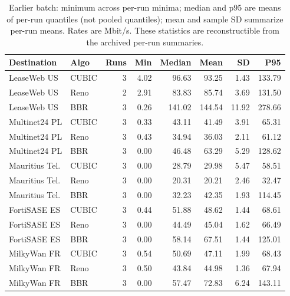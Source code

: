 \begin{table}[!htbp]
\centering
\footnotesize
\setlength{\tabcolsep}{3pt}
\caption{Earlier batch: minimum across per-run minima; median and p95 are means of per-run quantiles (not pooled quantiles); mean and sample SD summarize per-run means. Rates are Mbit/s. These statistics are reconstructible from the archived per-run summaries.}
\begin{tabular}{@{}llrrrrrr@{}}
\toprule
Destination & Algo & Runs & Min & Median & Mean & SD & P95 \\
\midrule
LeaseWeb US & CUBIC & 3 & 4.02 & 96.63 & 93.25 & 1.43 & 133.79 \\
LeaseWeb US & Reno & 2 & 2.91 & 83.83 & 85.74 & 3.69 & 131.50 \\
LeaseWeb US & BBR & 3 & 0.26 & 141.02 & 144.54 & 11.92 & 278.66 \\
Multinet24 PL & CUBIC & 3 & 0.33 & 43.11 & 41.49 & 3.91 & 65.31 \\
Multinet24 PL & Reno & 3 & 0.43 & 34.94 & 36.03 & 2.11 & 61.12 \\
Multinet24 PL & BBR & 3 & 0.00 & 46.48 & 63.29 & 5.29 & 128.62 \\
Mauritius Tel. & CUBIC & 3 & 0.00 & 28.79 & 29.98 & 5.47 & 58.51 \\
Mauritius Tel. & Reno & 3 & 0.00 & 20.31 & 20.21 & 2.46 & 32.47 \\
Mauritius Tel. & BBR & 3 & 0.00 & 32.23 & 42.35 & 1.93 & 114.45 \\
FortiSASE ES & CUBIC & 3 & 0.44 & 51.88 & 48.62 & 1.44 & 68.61 \\
FortiSASE ES & Reno & 3 & 0.00 & 44.49 & 45.04 & 1.62 & 66.49 \\
FortiSASE ES & BBR & 3 & 0.00 & 58.14 & 67.51 & 1.44 & 125.01 \\
MilkyWan FR & CUBIC & 3 & 0.54 & 50.69 & 47.11 & 1.99 & 68.43 \\
MilkyWan FR & Reno & 3 & 0.50 & 43.84 & 44.98 & 1.36 & 67.94 \\
MilkyWan FR & BBR & 3 & 0.00 & 57.47 & 72.83 & 6.24 & 143.11 \\
\bottomrule
\end{tabular}
\end{table}
